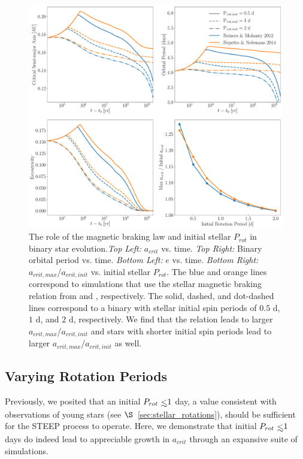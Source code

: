 \begin{figure}
	\includegraphics[width=\columnwidth]{var_MB.pdf}
   \caption{The role of the magnetic braking law and initial stellar $P_{rot}$ in binary star evolution.{\it Top Left:} $a_{crit}$ vs. time.  {\it Top Right:} Binary orbital period vs. time. {\it Bottom Left:} $e$ vs. time. {\it Bottom Right:} $a_{crit,max}$/$a_{crit,init}$ vs. initial stellar $P_{rot}$.  The blue and orange lines correspond to simulations that use the stellar magnetic braking relation from \citet{Reiners2012} and \citet{Repetto2014}, respectively.  The solid, dashed, and dot-dashed lines correspond to a binary with stellar initial spin periods of $0.5$ d, $1$ d, and $2$ d, respectively.  We find that the \citet{Repetto2014} relation leads to larger $a_{crit,max}$/$a_{crit,init}$ and stars with shorter initial spin periods lead to larger $a_{crit,max}$/$a_{crit,init}$ as well.}
    \label{fig:var_mb}
\end{figure}

\subsection{Varying Rotation Periods} \label{sec:var_rot}

Previously, we posited that an initial $P_{rot} \lsim 1$ day, a value consistent with observations of young stars (see $\S$~\ref{sec:stellar_rotations}), should be sufficient for the STEEP process to operate.  Here, we demonstrate that initial $P_{rot} \lsim 1$ days do indeed lead to appreciable growth in $a_{crit}$ through an expansive suite of simulations.

